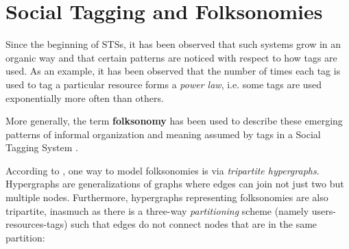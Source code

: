 \section{Social Tagging and Folksonomies}

Since the beginning of STSs, it has been observed that such systems grow in an organic way and that certain patterns are noticed with respect to how tags are used. As an example, it has been observed \citep{halpin_etal_2006} that the number of times each tag is used to tag a particular resource forms a \textit{power law}, i.e. some tags are used exponentially more often than others.

More generally, the term \textbf{folksonomy} has been used to describe  these emerging patterns of informal organization and meaning assumed by tags in a Social Tagging System \citep{mathes_2004,wal_2005_folksonomy}.

According to \cite{mika_2007}, one way to model folksonomies is via \textit{tripartite hypergraphs}. Hypergraphs are generalizations of graphs \citep{berge_1985} where edges can join not just two but multiple nodes. Furthermore, hypergraphs representing folksonomies are also tripartite, inasmuch as there is a three-way \textit{partitioning} scheme (namely users-resources-tags) such that edges do not connect nodes that are in the same partition:

